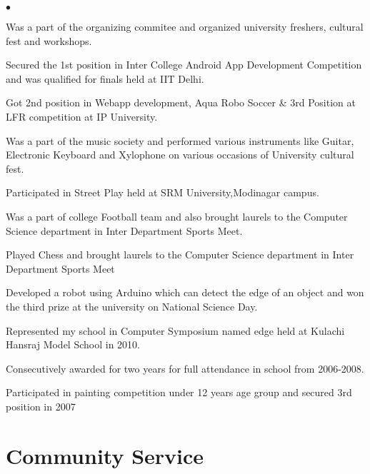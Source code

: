 \documentclass[margin,line]{res}
\newenvironment{list2}{
  \begin{list}{$\bullet$}{%
      \setlength{\itemsep}{0in}
      \setlength{\parsep}{0in} \setlength{\parskip}{0in}
      \setlength{\topsep}{0in} \setlength{\partopsep}{0in}
      \setlength{\leftmargin}{0.2in}}}{\end{list}}
\begin{document}
\begin{resume}
\begin{list2}
\item Was a part of the organizing commitee and organized university freshers, cultural fest and workshops. 
\item Secured the 1st position in Inter College Android App Development Competition and was qualified for finals held at IIT Delhi.
\item Got 2nd position in Webapp development, Aqua Robo Soccer \& 3rd Position at LFR competition at IP University.
\item Was a part of the music society and performed various instruments like Guitar, Electronic Keyboard and Xylophone on various occasions of University cultural fest.
\item Participated in Street Play held at SRM University,Modinagar campus.
\item Was a part of college Football team and also brought laurels to the Computer Science department in Inter Department Sports Meet.
\item Played Chess and brought laurels to the Computer Science department in Inter Department Sports Meet
\item Developed a robot using Arduino which can detect the edge of an object and won the third prize at the university on National Science Day.
\item Represented my school in Computer Symposium named edge held at Kulachi Hansraj Model School in 2010.
\item Consecutively awarded for two years for full attendance in school from 2006-2008.
\item Participated in painting competition under 12 years age group and secured 3rd position in 2007
\end{list2}

\section{\sc Community Service}


\end{resume}
\end{document}
